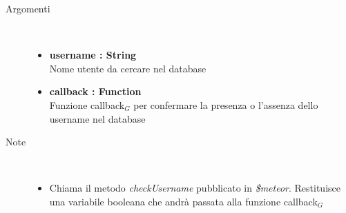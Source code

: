 \begin{description}
\begin{description}
		\begin{description}
			\item[Argomenti] \hfill \\
				\begin{itemize}
					\item \textbf{username : String			} \hfill \\
					Nome utente da cercare nel database
					\item \textbf{callback : Function			} \hfill \\
					Funzione callback$_G$ per confermare la presenza o l'assenza dello username nel database
					
				\end{itemize}
			\item[Note] \hfill \\
			\begin{itemize}
					\item Chiama il metodo \textit{checkUsername} pubblicato in \textit{\$meteor}. Restituisce una variabile booleana che andrà passata alla funzione callback$_G$
			\end{itemize}
		\end{description}
	\end{description}














\end{description}

